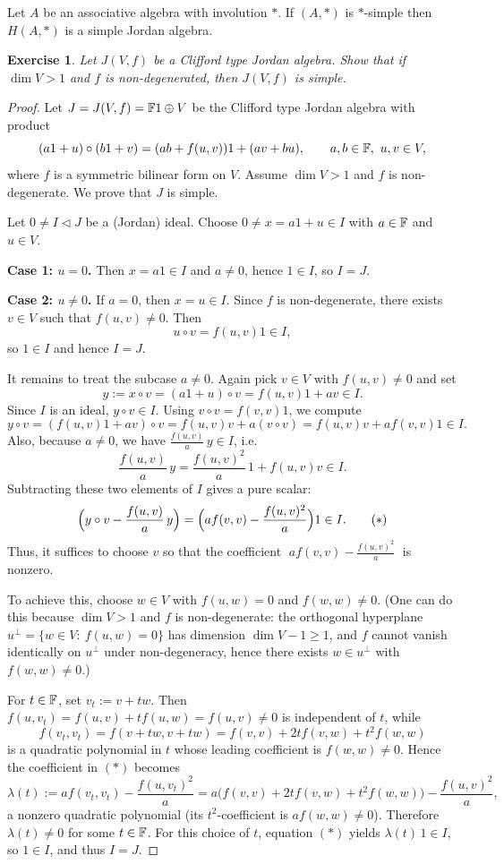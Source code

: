 \documentclass{article}
\newtheorem{exercise}[theorem]{Exercise}
\begin{document}
\begin{theorem}[Herstein] 
Let $ A $ be an associative algebra with involution $ * $. If $ (A,*) $ is $ * $-simple then $ H(A,*) $ is a simple Jordan algebra. 
\end{theorem}

\begin{exercise}
Let $ J(V,f) $ be a Clifford type Jordan algebra. Show that if $ \dim V > 1 $ and $ f $ is non-degenerated, then $ J(V,f) $ is simple.
\end{exercise}

\begin{proof}
Let $J=J(V,f)=\Bbb F1\oplus V$ be the Clifford type Jordan algebra with product
\[
(a1+u)\circ(b1+v)=(ab+f(u,v))1+(av+bu),
\qquad a,b\in\Bbb F,\ u,v\in V,
\]
where $f$ is a symmetric bilinear form on $V$. Assume $\dim V>1$ and $f$ is
non-degenerate. We prove that $J$ is simple.

Let $0\neq I\lhd J$ be a (Jordan) ideal. Choose $0\neq x=a1+u\in I$ with
$a\in\Bbb F$ and $u\in V$.

\noindent
\textbf{Case 1: $u=0$.}
Then $x=a1\in I$ and $a\neq 0$, hence $1\in I$, so $I=J$.

\noindent
\textbf{Case 2: $u\neq 0$.}
If $a=0$, then $x=u\in I$. Since $f$ is non-degenerate, there exists $v\in V$
such that $f(u,v)\neq 0$. Then
\[
u\circ v=f(u,v)1\in I,
\]
so $1\in I$ and hence $I=J$.

It remains to treat the subcase $a\neq 0$. Again pick $v\in V$ with
$f(u,v)\neq 0$ and set
\[
y:=x\circ v=(a1+u)\circ v=f(u,v)1+av\in I.
\]
Since $I$ is an ideal, $y\circ v\in I$. Using $v\circ v=f(v,v)1$, we compute
\[
y\circ v=(f(u,v)1+av)\circ v=f(u,v)v+a(v\circ v)=f(u,v)v+a f(v,v)1\in I.
\]
Also, because $a\neq 0$, we have $\frac{f(u,v)}{a}\,y\in I$, i.e.
\[
\frac{f(u,v)}{a}\,y=\frac{f(u,v)^2}{a}\,1+f(u,v)v\in I.
\]
Subtracting these two elements of $I$ gives a pure scalar:
\[
\Bigl(y\circ v-\frac{f(u,v)}{a}\,y\Bigr)
=\Bigl(a f(v,v)-\frac{f(u,v)^2}{a}\Bigr)1\in I. \tag{$\ast$}
\]
Thus, it suffices to choose $v$ so that the coefficient
$\;a f(v,v)-\frac{f(u,v)^2}{a}\;$ is nonzero.

To achieve this, choose $w\in V$ with $f(u,w)=0$ and $f(w,w)\neq 0$.
(One can do this because $\dim V>1$ and $f$ is non-degenerate: the orthogonal
hyperplane $u^\perp=\{w\in V:\ f(u,w)=0\}$ has dimension $\dim V-1\ge 1$, and
$f$ cannot vanish identically on $u^\perp$ under non-degeneracy, hence there
exists $w\in u^\perp$ with $f(w,w)\neq 0$.)

For $t\in\Bbb F$, set $v_t:=v+t w$. Then $f(u,v_t)=f(u,v)+t f(u,w)=f(u,v)\neq 0$
is independent of $t$, while
\[
f(v_t,v_t)=f(v+tw,v+tw)=f(v,v)+2t f(v,w)+t^2 f(w,w)
\]
is a quadratic polynomial in $t$ whose leading coefficient is $f(w,w)\neq 0$.
Hence the coefficient in $(\ast)$ becomes
\[
\lambda(t):=a f(v_t,v_t)-\frac{f(u,v_t)^2}{a}
=a\bigl(f(v,v)+2t f(v,w)+t^2 f(w,w)\bigr)-\frac{f(u,v)^2}{a},
\]
a nonzero quadratic polynomial (its $t^2$-coefficient is $a f(w,w)\neq 0$).
Therefore $\lambda(t)\neq 0$ for some $t\in\Bbb F$. For this choice of $t$,
equation $(\ast)$ yields $\lambda(t)\,1\in I$, so $1\in I$, and thus $I=J$.


\end{proof}
\end{document}
